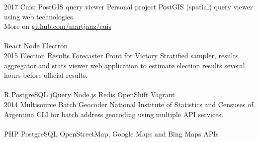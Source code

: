 \documentclass[]{cv-style}          %
\begin{document}
\begin{entrylist}
\entry
{2017}
{Cuis: PostGIS query viewer}
{Personal project}
{PostGIS (spatial) query viewer using web technologies.\\
More on \href{https://github.com/martjanz/cuis}{github.com/martjanz/cuis}\\
\\
React \textbullet{} Node \textbullet{} Electron\\
}
\entry
{2015}
{Election Results Forecaster}
{Front for Victory}
{Stratified sampler, results aggregator and stats viewer web application 
to estimate election results several hours before official results.\\
\\
R \textbullet{} PostgreSQL \textbullet{} jQuery \textbullet{} 
Node.js \textbullet{} Redis \textbullet{} OpenShift \textbullet{} Vagrant\\
}
\entry
{2014}
{Multisource Batch Geocoder}
{National Institute of Statistics and Censuses of Argentina}
{CLI for batch address geocoding using multiple API services.\\
\\
PHP \textbullet{} PostgreSQL \textbullet{} OpenStreetMap, Google Maps and Bing Maps APIs
}
{\vspace{-0.3cm}}
\end{entrylist}
\end{document}

